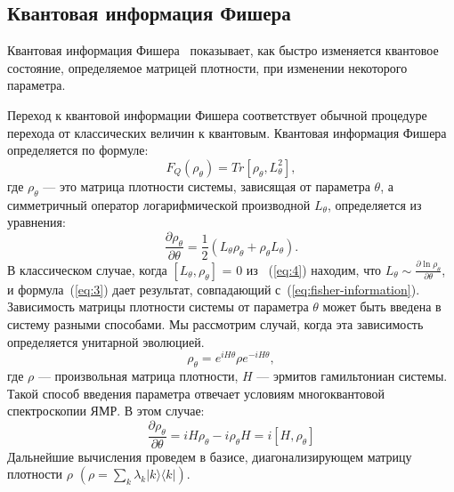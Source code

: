 \subsection{Квантовая информация Фишера}
\label{sec:quantum-fisher-information}
\begin{definition}\label{def:quantum-fisher-information}
  Квантовая информация Фишера~\cite{liu2014} показывает,
  как быстро изменяется квантовое состояние,
  определяемое матрицей плотности, при изменении некоторого параметра.
\end{definition}
Переход к квантовой информации Фишера соответствует обычной процедуре перехода от классических величин к квантовым.
Квантовая информация Фишера определяется по формуле:
%
\begin{equation}
    \label{eq:3}
        F_Q (\rho_\theta) =
            Tr[\rho_\theta, L^2_\theta],
\end{equation}
%
где $\rho_\theta$ --- это матрица плотности системы, зависящая от параметра $\theta$, а симметричный оператор логарифмической производной $L_\theta$, определяется из уравнения:
%
\begin{equation}
    \label{eq:4}
        \frac{\partial\rho_\theta}{\partial\theta} =
            \frac{1}{2}
                \left(L_\theta \rho_\theta +
                \rho_\theta L_\theta
            \right).
\end{equation}
%
В классическом случае, когда $\left[L_\theta, \rho_\theta \right]$ = 0 из ~(\ref{eq:4}) находим,
что ${L_\theta\sim\frac{\partial\ln\rho_\theta}{\partial\theta}}$,
и формула~(\ref{eq:3}) дает результат, совпадающий с~(\ref{eq:fisher-information}).
%
Зависимость матрицы плотности системы от параметра $\theta$ может быть введена в систему разными способами.
Мы рассмотрим случай, когда эта зависимость определяется унитарной эволюцией.
%
\begin{equation}
    \label{eq:5}
        \rho_\theta =
            e^{iH\theta}
        \rho e^{-iH\theta},
\end{equation}
%
где $\rho$ --- произвольная матрица плотности, $H$ --- эрмитов гамильтониан системы.
Такой способ введения параметра отвечает условиям многоквантовой спектроскопии ЯМР.
В этом случае:
%
\begin{equation}
    \label{eq:6}
        \frac{\partial\rho_\theta}{\partial\theta} =
            iH\rho_\theta - i\rho_\theta H =
        i \left[H,\rho_\theta \right]
\end{equation}
%
Дальнейшие вычисления проведем в базисе, диагонализирующем матрицу плотности $\rho$ $\left(\rho =\sum\limits_{k} \lambda_k |k\rangle  \langle k| \right)$.
